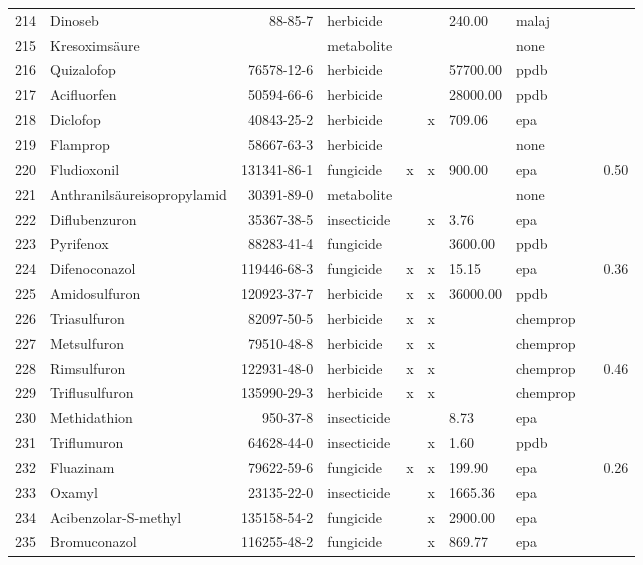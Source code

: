 \begin{longtable}{lp{3cm}rlp{0.5cm}p{0.5cm}p{1cm}p{1cm}p{1cm}p{1cm}}
  214 & Dinoseb & 88-85-7 & herbicide &  &  & 240.00 & malaj &  &  \\ 
  215 & Kresoximsäure &  & metabolite &  &  &  & none &  &  \\ 
  216 & Quizalofop & 76578-12-6 & herbicide &  &  & 57700.00 & ppdb &  &  \\ 
  217 & Acifluorfen & 50594-66-6 & herbicide &  &  & 28000.00 & ppdb &  &  \\ 
  218 & Diclofop & 40843-25-2 & herbicide &  & x & 709.06 & epa &  &  \\ 
  219 & Flamprop & 58667-63-3 & herbicide &  &  &  & none &  &  \\ 
  220 & Fludioxonil & 131341-86-1 & fungicide & x & x & 900.00 & epa &  & 0.50 \\ 
  221 & Anthranilsäureisopropylamid & 30391-89-0 & metabolite &  &  &  & none &  &  \\ 
  222 & Diflubenzuron & 35367-38-5 & insecticide &  & x & 3.76 & epa &  &  \\ 
  223 & Pyrifenox & 88283-41-4 & fungicide &  &  & 3600.00 & ppdb &  &  \\ 
  224 & Difenoconazol & 119446-68-3 & fungicide & x & x & 15.15 & epa &  & 0.36 \\ 
  225 & Amidosulfuron & 120923-37-7 & herbicide & x & x & 36000.00 & ppdb &  &  \\ 
  226 & Triasulfuron & 82097-50-5 & herbicide & x & x &  & chemprop &  &  \\ 
  227 & Metsulfuron & 79510-48-8 & herbicide & x & x &  & chemprop &  &  \\ 
  228 & Rimsulfuron & 122931-48-0 & herbicide & x & x &  & chemprop &  & 0.46 \\ 
  229 & Triflusulfuron & 135990-29-3 & herbicide & x & x &  & chemprop &  &  \\ 
  230 & Methidathion & 950-37-8 & insecticide &  &  & 8.73 & epa &  &  \\ 
  231 & Triflumuron & 64628-44-0 & insecticide &  & x & 1.60 & ppdb &  &  \\ 
  232 & Fluazinam & 79622-59-6 & fungicide & x & x & 199.90 & epa &  & 0.26 \\ 
  233 & Oxamyl & 23135-22-0 & insecticide &  & x & 1665.36 & epa &  &  \\ 
  234 & Acibenzolar-S-methyl & 135158-54-2 & fungicide &  & x & 2900.00 & epa &  &  \\ 
  235 & Bromuconazol & 116255-48-2 & fungicide &  & x & 869.77 & epa &  &  \\ 

\end{longtable}
